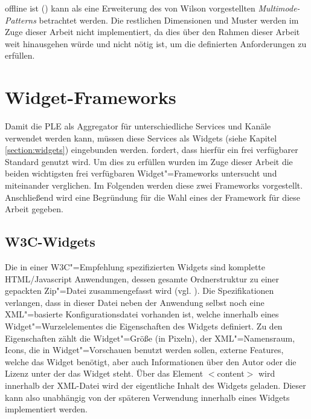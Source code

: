 offline ist () kann als eine Erweiterung des von Wilson vorgestellten \emph{Multimode-Patterns} betrachtet werden.   
Die restlichen Dimensionen und Muster werden im Zuge dieser Arbeit nicht implementiert, da dies über den Rahmen dieser Arbeit weit hinausgehen würde und nicht nötig ist, um die definierten Anforderungen zu erfüllen.

\section{Widget-Frameworks}\label{section:widget_frameworks}
Damit die \ac{PLE} als Aggregator für unterschiedliche Services und Kanäle verwendet werden kann, müssen diese Services als Widgets (siehe Kapitel \ref{section:widgets}) eingebunden werden.  fordert, dass hierfür ein frei verfügbarer Standard genutzt wird. Um dies zu erfüllen wurden im Zuge dieser Arbeit die beiden wichtigsten frei verfügbaren Widget"=Frameworks untersucht und miteinander verglichen. Im Folgenden werden diese zwei Frameworks vorgestellt. Anschließend wird eine Begründung für die Wahl eines der Framework für diese Arbeit gegeben.

\subsection{\ac{W3C}-Widgets}\label{section:w3c_widgets}
Die in einer \ac{W3C}"=Empfehlung spezifizierten Widgets sind komplette \ac{HTML}/Javascript Anwendungen, dessen gesamte Ordnerstruktur zu einer gepackten Zip"=Datei zusammengefasst wird (vgl. \cite{W3C-11-2012}). Die Spezifikationen verlangen, dass in dieser Datei neben der Anwendung selbst noch eine \ac{XML}"=basierte Konfigurationsdatei vorhanden ist, welche innerhalb eines Widget"=Wurzelelementes die Eigenschaften des Widgets definiert. Zu den Eigenschaften zählt die Widget"=Größe (in Pixeln), der \ac{XML}"=Namensraum, Icons, die in Widget"=Vorschauen benutzt werden sollen, externe Features, welche das Widget benötigt, aber auch Informationen über den Autor oder die Lizenz unter der das Widget steht. Über das Element $<$content$>$ wird innerhalb der \ac{XML}-Datei wird der eigentliche Inhalt des Widgets geladen. Dieser kann also unabhängig von der späteren Verwendung innerhalb eines Widgets implementiert werden.

